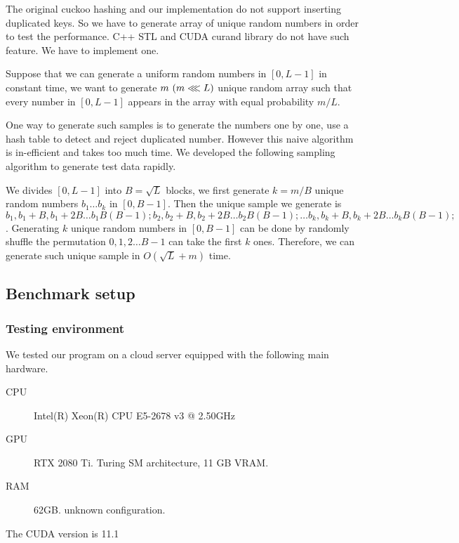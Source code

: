 \documentclass{article}
\begin{document}
The original cuckoo hashing and our implementation do not support inserting duplicated keys.
So we have to generate array of unique random numbers in order to test the performance.
C++ STL and CUDA curand library do not have such feature. We have to implement one.\par

Suppose that we can generate a uniform random numbers in $[0,L-1]$ in constant time,
we want to generate $m\ (m\llless L)$ unique random array such that every number in $[0,L-1]$ appears in the array with equal probability $m/L$.\par
One way to generate such samples is to generate the numbers one by one, use a hash table to detect and reject duplicated number.
However this naive algorithm is in-efficient and takes too much time. We developed the following sampling algorithm to generate test data rapidly.\par

We divides $[0,L-1]$ into $B=\sqrt L$ blocks, we first generate $k=m/B$ unique random numbers $b_1\ldots b_{k}$ in $[0,B-1]$.
Then the unique sample we generate is
$
	b_1,b_1+B,b_1+2B\ldots b_1 B(B-1);
	b_2,b_2+B,b_2+2B\ldots b_2 B(B-1);
	\ldots
	b_k,b_k+B,b_k+2B\ldots b_k B(B-1);
$.
Generating $k$ unique random numbers in $[0,B-1]$ can be done by randomly shuffle the permutation $0,1,2\ldots B-1$  can take the first $k$ ones.
Therefore, we can generate such unique sample in $O(\sqrt L+m)$ time.


\subsection{Benchmark setup}

\subsubsection*{Testing environment}

We tested our program on a cloud server equipped with the following main hardware.

\begin{description}
	\item[CPU] Intel(R) Xeon(R) CPU E5-2678 v3 @ 2.50GHz
	\item[GPU] RTX 2080 Ti. Turing SM architecture, 11 GB VRAM.
	\item[RAM] 62GB. unknown configuration.
\end{description}

The CUDA version is 11.1
\end{document}
